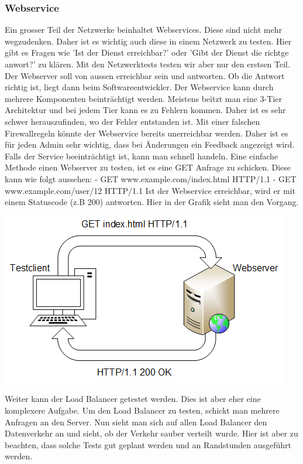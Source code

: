 \documentclass[a4,12pt]{scrartcl}
\begin{document}
\subsubsection{Webservice}
Ein grosser Teil der Netzwerke beinhaltet Webservices. Diese sind nicht mehr wegzudenken. Daher ist es wichtig auch diese in einem Netzwerk zu testen. Hier gibt es Fragen wie 'Ist der Dienst erreichbar?' oder 'Gibt der Dienst die richtge anwort?' zu klären. Mit den Netzwerktests testen wir aber nur den erstsen Teil. Der Webserver soll von aussen erreichbar sein und antworten. Ob die Antwort richtig ist, liegt dann beim Softwareentwickler.\newline\newline
Der Webservice kann durch mehrere Komponenten beinträchtigt werden. Meistens beitzt man eine 3-Tier Architektur und bei jedem Tier kann es zu Fehlern kommen. Daher ist es sehr schwer herauszufinden, wo der Fehler entstanden ist. Mit einer falschen Firewallregeln könnte der Webservice bereits unerreichbar werden. Daher ist es für jeden Admin sehr wichtig, dass  bei Änderungen ein Feedback angezeigt wird. Falls der Service beeinträchtigt ist, kann man schnell handeln.\newline\newline
Eine einfache Methode einen Webserver zu testen, ist es eine GET Anfrage zu schicken. Diese kann wie folgt aussehen:\newline
- GET www.example.com/index.html HTTP/1.1 \newline
- GET www.example.com/user/12 HTTP/1.1 \newline
Ist der Webservice erreichbar, wird er mit einem Statuscode (z.B 200) antworten. Hier in der Grafik sieht man den Vorgang.
\begin{center}
\includegraphics[scale=1]{figures/httpget.png}
\end{center}
Weiter kann der Load Balancer getestet werden. Dies ist aber eher eine komplexere Aufgabe. Um den Load Balancer zu testen, schickt man mehrere Anfragen an den Server. Nun sieht man sich auf allen Load Balancer den Datenverkehr an und sieht, ob der Verkehr sauber verteilt wurde. Hier ist aber zu beachten, dass solche Tests gut geplant werden und an Randstunden ausgeführt werden.
\end{document}
